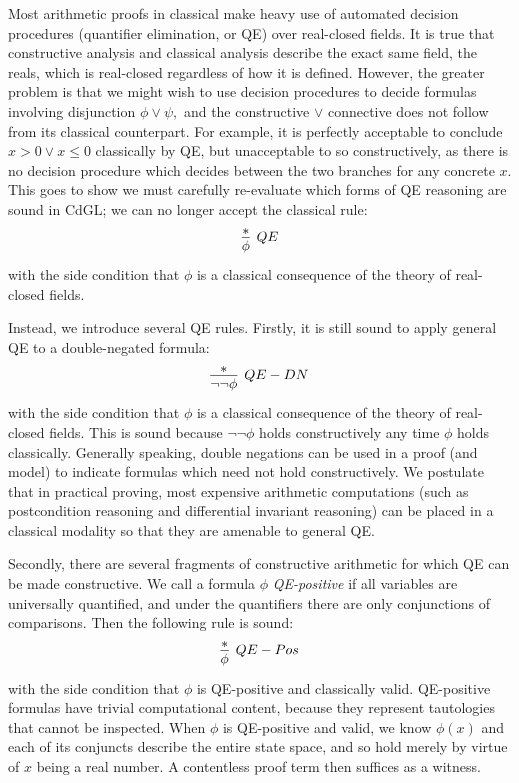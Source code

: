 \documentclass[12pt]{cmuthesis}
\theoremstyle{definition}
\theoremstyle{remark}
\newcommand{\CdGL}{\textsf{CdGL}\xspace}
\begin{document}
Most arithmetic proofs in classical \dGL make heavy use of automated decision procedures (quantifier elimination, or QE) over real-closed fields.
It is true that constructive analysis and classical analysis describe the exact same field, the reals, which is real-closed regardless of how it is defined.
However, the greater problem is that we might wish to use decision procedures to decide formulas involving disjunction $\phi \lor \psi,$ and the constructive $\lor$ connective does not follow from its classical counterpart.
For example, it is perfectly acceptable to conclude $x > 0 \lor x \leq 0$ classically by QE, but unacceptable to so constructively, as there is no decision procedure which decides between the two branches for any concrete $x$.
This goes to show we must carefully re-evaluate which forms of QE reasoning are sound in \CdGL; we can no longer accept the classical rule:
\[\infer[QE]{\phi}{*}\] with the side condition that $\phi$ is a classical consequence of the theory of real-closed fields.

Instead, we introduce several QE rules.
Firstly, it is still sound to apply general QE to a double-negated formula:
\[\infer[QE-DN]{\neg\neg\phi}{*}\] with the side condition that $\phi$ is a classical consequence of the theory of real-closed fields.
This is sound because $\neg\neg\phi$ holds constructively any time $\phi$ holds classically.
Generally speaking, double negations can be used in a proof (and model) to indicate formulas which need not hold constructively.
We postulate that in practical proving, most expensive arithmetic computations (such as postcondition reasoning and differential invariant reasoning) can be placed in a classical modality so that they are amenable to general QE.

Secondly, there are several fragments of constructive arithmetic for which QE can be made constructive.
We call a formula $\phi$ \emph{QE-positive} if all variables are universally quantified, and under the quantifiers there are only conjunctions of comparisons.
Then the following rule is sound:
\[\infer[QE-Pos]{\phi}{*}\] with the side condition that $\phi$ is  QE-positive and classically valid.
QE-positive formulas have trivial computational content, because they represent tautologies that cannot be inspected.
When $\phi$ is QE-positive and valid, we know $\phi(x)$ and each of its conjuncts describe the entire state space, and so hold merely by virtue of $x$ being a real number.
A contentless proof term then suffices as a witness.
\end{document}
